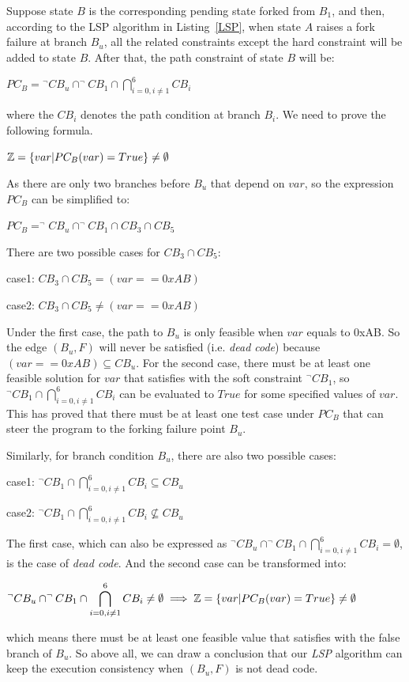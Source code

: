 Suppose state $B$ is the corresponding pending state forked from $B_1$, and then, according to the LSP algorithm in Listing~\ref{LSP}, when state $A$ raises a fork failure at branch $B_u$, all the related constraints except the hard constraint will be added to state $B$. After that, the path constraint of state $B$ will be:
\begin{center}
$PC_B = \displaystyle ^\neg CB_u \cap ^\neg CB_1 \cap \bigcap\limits_{i=0,i \neq 1}^{6} CB_i$
\end{center}
\noindent where the $CB_i$ denotes the path condition at branch $B_i$. We need to prove the following formula.
\begin{center}
$\mathbb{Z} = \{var\arrowvert PC_B(var) = True\} \neq \emptyset$
\end{center}

As there are only two branches before $B_u$ that depend on $var$, so the expression $PC_B$ can be simplified to:
\begin{center}
$PC_B = ^\neg CB_u \cap ^\neg CB_1 \cap CB_3 \cap CB_5$
\end{center}

There are two possible cases for $CB_3 \cap CB_5$:
\begin{center}
case1: $CB_3 \cap CB_5 = (var == 0xAB)$

case2: $CB_3 \cap CB_5 \neq (var == 0xAB)$
\end{center}

Under the first case, the path to $B_u$ is only feasible when $var$ equals to 0xAB. So the edge $(B_u, F)$ will never be satisfied (i.e. \emph{dead code}) because $(var == 0xAB) \subseteq CB_u$. For the second case, there must be at least one feasible solution for $var$ that satisfies with the soft constraint $^\neg CB_1$, so $^\neg CB_1 \cap \bigcap_{i=0,i \neq 1}^{6} CB_i$ can be evaluated to $True$ for some specified values of $var$. This has proved that there must be at least one test case under $PC_B$ that can steer the program to the forking failure point $B_u$.

Similarly, for branch condition $B_u$, there are also two possible cases:
\begin{center}
case1: $\displaystyle ^\neg CB_1 \cap \bigcap\limits_{i=0,i\neq 1}^6 CB_i \subseteq CB_u$

case2: $\displaystyle ^\neg CB_1 \cap \bigcap\limits_{i=0,i\neq 1}^6 CB_i \nsubseteq CB_u$
\end{center}

The first case, which can also be expressed as $^\neg CB_u \cap ^\neg CB_1 \cap \bigcap_{i=0,i\neq 1}^6 CB_i = \emptyset$, is the case of \emph{dead code}. And the second case can be transformed into:
\begin{center}
$\displaystyle ^\neg CB_u \cap ^\neg CB_1 \cap \bigcap\limits_{i=0,i\neq 1}^6 CB_i \neq \emptyset \implies \mathbb{Z} = \{var\arrowvert PC_B(var) = True\} \neq \emptyset$
\end{center}

\noindent which means there must be at least one feasible value that satisfies with the false branch of $B_u$. So above all, we can draw a conclusion that our \emph{LSP} algorithm can keep the execution consistency when $(B_u, F)$ is not dead code.